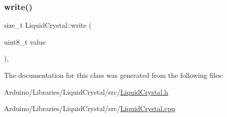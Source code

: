 \subsubsection{\texorpdfstring{write()}{write()}}
{\footnotesize\ttfamily size\+\_\+t Liquid\+Crystal\+::write (\begin{DoxyParamCaption}\item[{uint8\+\_\+t}]{value }\end{DoxyParamCaption})\hspace{0.3cm}{\ttfamily [inline]}, {\ttfamily [virtual]}}



The documentation for this class was generated from the following files\+:\begin{DoxyCompactItemize}
\item 
Arduino/\+Libraries/\+Liquid\+Crystal/src/\hyperlink{_liquid_crystal_8h}{Liquid\+Crystal.\+h}\item 
Arduino/\+Libraries/\+Liquid\+Crystal/src/\hyperlink{_liquid_crystal_8cpp}{Liquid\+Crystal.\+cpp}\end{DoxyCompactItemize}
